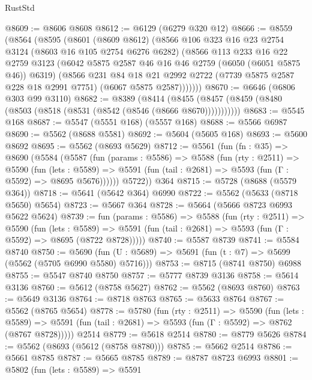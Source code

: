 \begin{lexlean}{RustStd}
\begin{coremodule}
@8609 := @8606 @8608
@8612 := @6129 (@6279 @320 @12)
@8666 := @8559
    (@8564
      (@8595
        (@8601
          (@8609 @8612)
          (@8566
            @106
            @323
            @16
            @23
            @2754
            @3124
            (@8603 @16 @105 @2754 @6276 @6282)
            (@8566
              @113
              @233
              @16
              @22
              @2759
              @3123
              (@6042 @5875 @2587 @46 @16 @46 @2759 (@6050 (@6051 @5875 @46)) @6319)
              (@8566
                @231
                @84
                @18
                @21
                @2992
                @2722
                (@7739 @5875 @2587 @228 @18 @2991 @7751)
                (@6067 @5875 @2587)))))))
@8670 := @6646 (@6806 @303 @99 @3110)
@8682 := @8389
    (@8414 (@8455 (@8457 (@8459 (@8480 (@8503 (@8518 (@8531 (@8542 (@8546 (@8666 @8670)))))))))))
@8683 := @5545 @168
@8687 := @5547 (@5551 @168) (@5557 @168)
@8688 := @5566 @6987
@8690 := @5562 (@8688 @5581)
@8692 := @5604 (@5605 @168)
@8693 := @5600 @8692
@8695 := @5562 (@8693 @5629)
@8712 := @5561
    (fun (fn : @35) =>
    @8690
      (@5584
        (@5587
          (fun (params : @5586) =>
          @5588
            (fun (rty : @2511) =>
            @5590
              (fun (lets : @5589) =>
              @5591 (fun (tail : @2681) => @5593 (fun (Γ : @5592) => @8695 @5676))))))
        @5722))
    @364
@8715 := @5728 (@8688 (@5579 @364))
@8718 := @5641 (@5642 @364) @6990
@8722 := @5562 (@5633 (@8718 @5650) @5654)
@8723 := @5667 @364
@8728 := @5664 (@5666 @8723 @6993 @5622 @5624)
@8739 := fun (params : @5586) =>
  @5588
    (fun (rty : @2511) =>
    @5590
      (fun (lets : @5589) =>
      @5591 (fun (tail : @2681) => @5593 (fun (Γ : @5592) => @8695 (@8722 @8728)))))
@8740 := @5587 @8739
@8741 := @5584 @8740
@8750 := @5690 (fun (U : @5689) => @5691 (fun (t : @7) => @5699 (@5562 (@5705 @6990 @5580) @5716)))
@8753 := @8715 (@8741 @8750) @6988
@8755 := @5547 @8740 @8750
@8757 := @5777 @8739 @3136
@8758 := @5614 @3136
@8760 := @5612 (@8758 @5627)
@8762 := @5562 (@8693 @8760)
@8763 := @5649 @3136
@8764 := @8718 @8763
@8765 := @5633 @8764
@8767 := @5562 (@8765 @5654)
@8778 := @5780
    (fun (rty : @2511) =>
    @5590
      (fun (lets : @5589) =>
      @5591 (fun (tail : @2681) => @5593 (fun (Γ : @5592) => @8762 (@8767 @8728)))))
    @2514
@8779 := @5618 @2514
@8780 := @8779 @5626
@8784 := @5562 (@8693 (@5612 (@8758 @8780)))
@8785 := @5662 @2514
@8786 := @5661 @8785
@8787 := @5665 @8785
@8789 := @8787 @8723 @6993
@8801 := @5802
    (fun (lets : @5589) =>
    @5591

\end{coremodule}
\end{lexlean}
